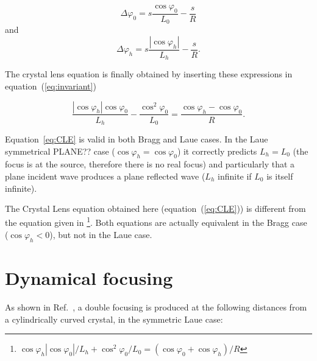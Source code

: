 \documentclass{iucr}              %
\newcommand{\inblue}[1]{{\color{blue}#1}}
\newcommand{\inred}[1]{{\color{red}#1}}
\begin{document}
\begin{equation}
\label{angles}
\Delta \varphi_0 = s \frac{\cos\varphi_0}{L_0} - \frac{s}{R}
\end{equation}
and 
\begin{equation}
\Delta \varphi_h = s \frac{|\cos\varphi_h|}{L_h} - \frac{s}{R}.
\end{equation}

The crystal lens equation is finally obtained by inserting these expressions in equation~(\ref{eq:invariant})

\begin{equation}
\label{eq:CLE}
\frac{|\cos\varphi_h| \cos\varphi_0}{L_h} - \frac{\cos^2\varphi_0}{L_0} = \frac{\cos\varphi_h - \cos\varphi_0}{R}.
\end{equation}


Equation~\ref{eq:CLE} is valid in both Bragg and Laue cases. In the Laue symmetrical \inred{PLANE??} case ($\cos\varphi_h=\cos\varphi_0$) it correctly predicts $L_h=L_0$ \inblue{(the focus is at the source, therefore there is no real focus)} and particularly that a plane incident wave produces a plane reflected wave ($L_h$ infinite if $L_0$ is itself infinite).

\inblue{The Crystal Lens equation obtained here (equation~(\ref{eq:CLE})) is different from the equation given in \cite{CK}\footnote{ 
$
\cos\varphi_h |\cos\varphi_0|/L_h + \cos^2\varphi_0/L_0 = (\cos\varphi_0 + \cos\varphi_h)/R 
$}. Both equations are actually equivalent in the Bragg case ($\cos\varphi_h<0$), but not in the Laue case. }



\section{Dynamical focusing}

As shown in Ref.~\cite{GuigayFerrero2012}, a double focusing is produced at the following distances from a cylindrically curved crystal, in the symmetric Laue case:
\end{document}
